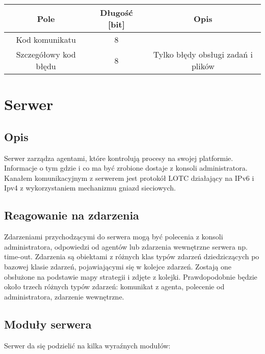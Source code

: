 \documentclass[10pt,a4paper]{article}
\begin{document}
            \begin{tabular}{ c | c | c  }
			    \textbf{Pole} & \textbf{Długość [bit]} & \textbf{Opis} \\
			    \hline
			    Kod komunikatu & 8 & \\
			    Szczegółowy kod błędu & 8 & Tylko błędy obsługi zadań i plików \\
			\end{tabular}
    
    \section{Serwer}
			
		\subsection{Opis}
			Serwer zarządza agentami, które kontrolują procesy na swojej platformie. Informacje o tym gdzie i co ma być zrobione dostaje z konsoli administratora. Kanałem komunikacyjnym z serwerem jest protokół LOTC działający na IPv6 i Ipv4 z wykorzystaniem mechanizmu gniazd sieciowych. \\
		
		\subsection{Reagowanie na zdarzenia}
			Zdarzeniami przychodzącymi do serwera mogą być polecenia z konsoli administratora, odpowiedzi od agentów lub zdarzenia wewnętrzne serwera np. time-out. Zdarzenia są obiektami z różnych klas typów zdarzeń dziedziczących po bazowej klasie zdarzeń, pojawiającymi się w kolejce zdarzeń. Zostają one obsłużone na podstawie mapy strategii i zdjęte z kolejki. Prawdopodobnie będzie około trzech różnych typów zdarzeń: komunikat z agenta, polecenie od administratora, zdarzenie wewnętrzne.
		
		\subsection{Moduły serwera}
			Serwer da się podzielić na kilka wyraźnych modułów: \\
			
\end{document}
